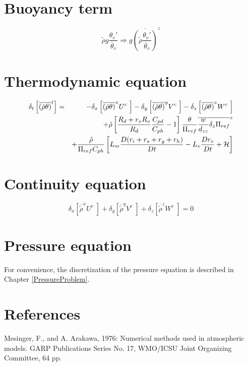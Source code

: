 \section{Buoyancy term}
\begin{equation}
\tilde{\rho} g \dfrac{\theta_v ' }{\overline{\theta}_v}
\Longrightarrow g \overline{ \left(
\tilde{\rho}\dfrac{\theta_v ' }{\overline{\theta}_v}\right) }^{z}
\end{equation}

\section{Thermodynamic equation}

\begin{eqnarray}
\delta _{t } \left[ \overline{ \left( \tilde{\rho} \theta
\right)}^{t} \right]  & =  & - \delta_{x} \left[\overline{\left(
\tilde{\rho} \theta\right)}^{x} U^{c} \;
\right] - \delta_{y} \left[\overline{\left(
\tilde{\rho}\theta\right)}^{y}  V^{c} \;
\right] - \delta_{z} \left[\overline{ \left(
\tilde{\rho}\theta\right)}^{z} W^{c} \;
\right] \nonumber \\ & &
+\tilde{\rho} \left[ {R_d+r_vR_v\over R_d}{C_{pd} \over C_{ph}}-1 \right]
{\theta \over \Pi_{ref}} \overline{ {w \over d_{zz} } \delta_z \Pi_{ref} }^z
\nonumber \\ & &
+ {\tilde{\rho}\over \Pi_{ref} C_{ph}} \left[
 L_m {D(r_i+r_s+r_g+r_h)\over Dt} - L_v {Dr_v\over Dt} + {\cal H}  \right]
\end{eqnarray}


\section{Continuity equation}

\begin{equation}
\delta_{x} \left[ \overline{\tilde{\rho}}^{x} U^{c} \; \right] +
\delta_{y} \left[ \overline{\tilde{\rho}}^{y} V^{c} \; \right] +
\delta_{z} \left[ \overline{\tilde{\rho}}^{z} W^{c} \; \right] =0
\end{equation}

\section{Pressure equation}

For convenience, the discretization of the pressure equation is described
in Chapter \ref{PressureProblem}.

\section{References}
\decrefname
Mesinger, F., and A. Arakawa, 1976:
Numerical methods used in atmospheric models.
GARP Publications Series No. 17, WMO/ICSU Joint Organizing Committee, 64 pp.

%

